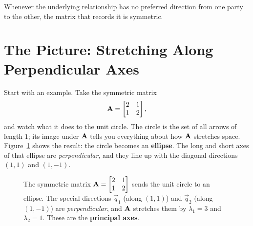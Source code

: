Whenever the underlying relationship has no preferred direction from one party
to the other, the matrix that records it is symmetric.

\section{The Picture: Stretching Along Perpendicular Axes}
\label{ch26:picture}

Start with an example. Take the symmetric matrix
\[
  \mathbf{A} = \begin{bmatrix} 2 & 1 \\ 1 & 2 \end{bmatrix},
\]
and watch what it does to the unit circle. The circle is the set of all arrows of
length $1$; its image under $\mathbf{A}$ tells you everything about how $\mathbf{A}$
stretches space. Figure~\ref{ch26:fig-ellipse} shows the result: the circle
becomes an \textbf{ellipse}. The long and short
axes of that ellipse are \emph{perpendicular}, and they line up with the diagonal
directions $(1,1)$ and $(1,-1)$.

\begin{figure}[H]
\centering
{}
\caption{The symmetric matrix $\mathbf{A}=\protect\begin{bmatrix}2&1\\1&2\protect\end{bmatrix}$
sends the unit circle to an ellipse. The special directions
$\vec{q}_1$ (along $(1,1)$) and $\vec{q}_2$ (along $(1,-1)$) are
\emph{perpendicular}, and $\mathbf{A}$ stretches them by $\lambda_1 = 3$ and
$\lambda_2 = 1$. These are the \textbf{principal axes}.}
\label{ch26:fig-ellipse}
\end{figure}

